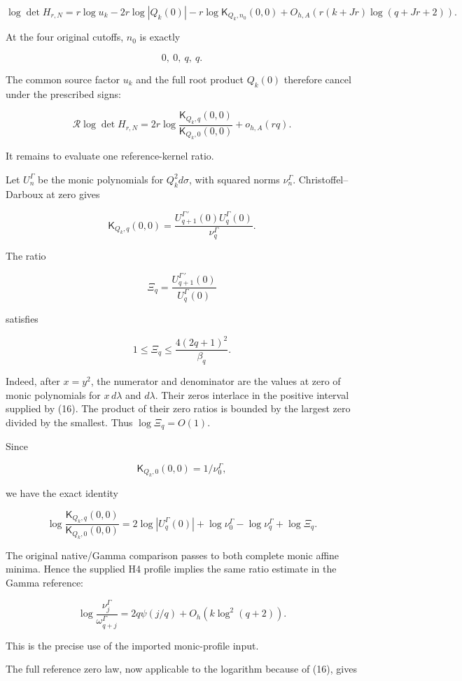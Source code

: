 \documentclass[11pt]{article}
\begin{document}
\[
\log\det H_{r,N}
=
r\log u_k
-2r\log|Q_k(0)|
-r\log\mathsf K_{Q_k,n_0}(0,0)
+
O_{h,A}\!\left(r(k+Jr)\log(q+Jr+2)\right).
\tag{39}
\]

At the four original cutoffs, \(n_0\) is exactly

\[
0,\ 0,\ q,\ q.
\]

The common source factor \(u_k\) and the full root product \(Q_k(0)\) therefore cancel under the prescribed signs:

\[
\boxed{
\mathcal R\log\det H_{r,N}
=
2r\log
\frac{\mathsf K_{Q_k,q}(0,0)}
     {\mathsf K_{Q_k,0}(0,0)}
+o_{h,A}(rq).
}
\tag{40}
\]

It remains to evaluate one reference-kernel ratio.

Let \(U_n^\Gamma\) be the monic polynomials for \(Q_k^2d\sigma\), with squared norms \(\nu_n^\Gamma\). Christoffel--Darboux at zero gives

\[
\mathsf K_{Q_k,q}(0,0)
=
\frac{U_{q+1}^{\Gamma\,\prime}(0)U_q^\Gamma(0)}
{\nu_q^\Gamma}.
\]

The ratio

\[
\Xi_q=
\frac{U_{q+1}^{\Gamma\,\prime}(0)}{U_q^\Gamma(0)}
\]

satisfies

\[
1\le\Xi_q\le
\frac{4(2q+1)^2}{\beta_q}.
\tag{41}
\]

Indeed, after \(x=y^2\), the numerator and denominator are the values at zero of monic polynomials for \(x\,d\lambda\) and \(d\lambda\). Their zeros interlace in the positive interval supplied by (16). The product of their zero ratios is bounded by the largest zero divided by the smallest. Thus \(\log\Xi_q=O(1)\).

Since

\[
\mathsf K_{Q_k,0}(0,0)=1/\nu_0^\Gamma,
\]

we have the exact identity

\[
\boxed{
\log\frac{\mathsf K_{Q_k,q}(0,0)}
{\mathsf K_{Q_k,0}(0,0)}
=
2\log|U_q^\Gamma(0)|
+\log\nu_0^\Gamma-\log\nu_q^\Gamma+\log\Xi_q.
}
\tag{42}
\]

The original native/Gamma comparison passes to both complete monic affine minima. Hence the supplied H4 profile implies the same ratio estimate in the Gamma reference:

\[
\log\frac{\nu_j^\Gamma}{\omega_{q+j}^\Gamma}
=
2q\psi(j/q)+O_h(k\log^2(q+2)).
\tag{43}
\]

This is the precise use of the imported monic-profile input.

The full reference zero law, now applicable to the logarithm because of (16), gives
\end{document}
